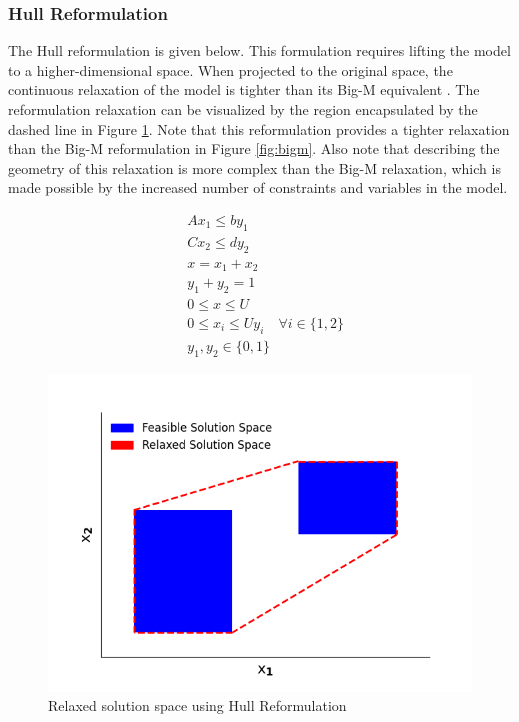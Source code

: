 \documentclass{juliacon}
\begin{document}
\subsubsection{Hull Reformulation}
The Hull reformulation is given below. This formulation requires lifting the model to a higher-dimensional space. When projected to the original space, the continuous relaxation of the model is tighter than its Big-M equivalent \cite{grossmann_trespalacios_2013}. The reformulation relaxation can be visualized by the region encapsulated by the dashed line in Figure \ref{fig:chr}. Note that this reformulation provides a tighter relaxation than the Big-M reformulation in Figure \ref{fig:bigm}. Also note that describing the geometry of this relaxation is more complex than the Big-M relaxation, which is made possible by the increased number of constraints and variables in the model.

\begin{align*}
    & Ax_1 \leq by_1 \\
    & Cx_2 \leq dy_2 \\
    & x = x_1 + x_2 \\
    & y_1 + y_2 = 1 \\
    & 0 \leq x \leq U \\
    & 0 \leq x_i \leq U y_i \quad \forall i \in \{1,2\} \\
    & y_1, y_2 \in \{0,1\}
\end{align*}

\begin{figure}
    \centering
    \includegraphics[scale=0.5]{chr.png}
    \caption{Relaxed solution space using Hull Reformulation}
    \label{fig:chr}
\end{figure}
\end{document}
